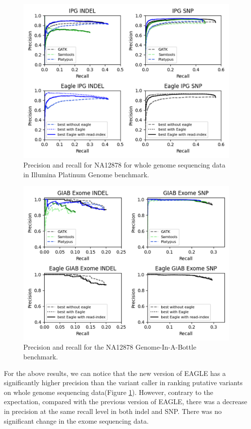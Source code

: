 \documentclass[PhD]{PHlab-thesis}
\begin{document}
\begin{figure}[h!]
	\centering
	\includegraphics[scale=0.45]{figures/IPG_result.png}
	\caption{Precision and recall for NA12878 for whole genome sequencing data in Illumina Platinum Genome benchmark.}
	\label{fig:The result of IPG dataset}
\end{figure}

\begin{figure}[h!]
	\centering
	\includegraphics[scale=0.45]{figures/GIAB_result.png}
	\caption{Precision and recall for the NA12878 Genome-In-A-Bottle benchmark.}
	\label{fig:The result of GIAB dataset}
\end{figure}

For the above results, we can notice that the new version of EAGLE has a significantly higher precision than the variant caller in ranking putative variants on whole genome sequencing data(Figure \ref{fig:The result of IPG dataset}). However, contrary to the expectation, compared with the previous version of EAGLE, there was a decrease in precision at the same recall level in both indel and SNP.  There was no significant change in the exome sequencing data.
\end{document}
